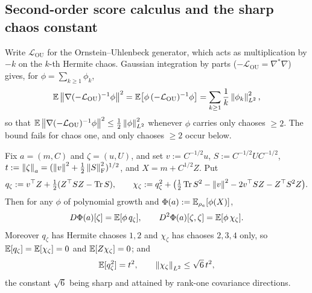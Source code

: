 \subsection{Second-order score calculus and the sharp chaos constant}

Write $\mathcal L_{\mathrm{OU}}$ for the Ornstein--Uhlenbeck generator, which acts as
multiplication by $-k$ on the $k$-th Hermite chaos. Gaussian integration by parts
($-\mathcal L_{\mathrm{OU}}=\nabla^*\nabla$) gives, for $\phi=\sum_{k\geq1}\phi_k$,
\begin{equation}
\label{eq:OU-inverse}
    \mathbb{E}\left\lVert \nabla(-\mathcal L_{\mathrm{OU}})^{-1}\phi\right\rVert^2
    =\mathbb{E}\bigl[\phi\,(-\mathcal L_{\mathrm{OU}})^{-1}\phi\bigr]
    =\sum_{k\geq1}\frac1k\left\lVert \phi_k\right\rVert_{L^2}^2 ,
\end{equation}
so that $\mathbb{E}\left\lVert \nabla(-\mathcal L_{\mathrm{OU}})^{-1}\phi\right\rVert^2\leq\tfrac12\left\lVert \phi\right\rVert_{L^2}^2$
whenever $\phi$ carries only chaoses $\geq2$. The bound fails for chaos one, and only chaoses
$\geq2$ occur below.

\begin{lemma}
\label{lem:second-score}
Fix $a=(m,C)$ and $\zeta=(u,U)$, and set $v:=C^{-1/2}u$, $S:=C^{-1/2}UC^{-1/2}$,
$t:=\left\lVert \zeta\right\rVert_a=(\left\lVert v\right\rVert^2+\tfrac12\left\lVert S\right\rVert_{\mathrm{F}}^2)^{1/2}$, and $X=m+C^{1/2}Z$. Put
\[
    q_\zeta:=v^\top Z+\tfrac12(Z^\top SZ-\operatorname{Tr} S),
    \qquad
    \chi_\zeta:=q_\zeta^2+\bigl(\tfrac12\operatorname{Tr} S^2-\left\lVert v\right\rVert^2-2v^\top SZ-Z^\top S^2Z\bigr).
\]
Then for any $\phi$ of polynomial growth and $\Phi(a):=\mathbb{E}_{\rho_a}[\phi(X)]$,
\[
    D\Phi(a)[\zeta]=\mathbb{E}[\phi\,q_\zeta],
    \qquad
    D^2\Phi(a)[\zeta,\zeta]=\mathbb{E}[\phi\,\chi_\zeta].
\]
Moreover $q_\zeta$ has Hermite chaoses $1,2$ and $\chi_\zeta$ has chaoses $2,3,4$ only, so
$\mathbb{E}[q_\zeta]=\mathbb{E}[\chi_\zeta]=0$ and $\mathbb{E}[Z\chi_\zeta]=0$; and
\[
    \mathbb{E}[q_\zeta^2]=t^2,
    \qquad
    \left\lVert \chi_\zeta\right\rVert_{L^2}\leq\sqrt6\,t^2,
\]
the constant $\sqrt6$ being sharp and attained by rank-one covariance directions.
\end{lemma}

